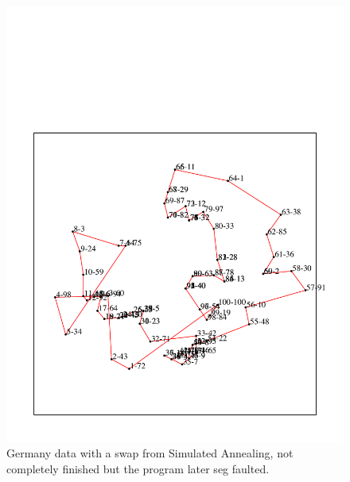 \begin{figure}[htbp]
  \centering
  \includegraphics[width=1.0\textwidth]{./media/germany_100_swap.pdf}
  \caption{ \label{Figure_1} Germany data with a swap from Simulated Annealing, not completely finished but the program later seg faulted.}
\end{figure}

